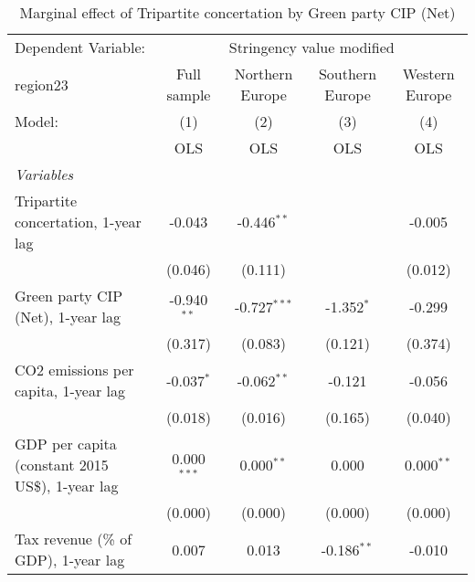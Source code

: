 
\begin{table}[htbp]
   \caption{Marginal effect of Tripartite concertation by Green party CIP (Net)}
   \centering
   \begin{tabular}{lcccc}
      \toprule
      Dependent Variable: & \multicolumn{4}{c}{Stringency value modified}\\
      region23                                                                & Full sample   & Northern Europe & Southern Europe & Western Europe \\   
      Model:                                                                  & (1)           & (2)             & (3)             & (4)\\  
                                                                              &  OLS          & OLS             & OLS             & OLS\\  
      \midrule
      \emph{Variables}\\
      Tripartite concertation, 1-year lag                                     & -0.043        & -0.446$^{**}$   &                 & -0.005\\   
                                                                              & (0.046)       & (0.111)         &                 & (0.012)\\   
      Green party CIP (Net), 1-year lag                                       & -0.940$^{**}$ & -0.727$^{***}$  & -1.352$^{*}$    & -0.299\\   
                                                                              & (0.317)       & (0.083)         & (0.121)         & (0.374)\\   
      CO2 emissions per capita, 1-year lag                                    & -0.037$^{*}$  & -0.062$^{**}$   & -0.121          & -0.056\\   
                                                                              & (0.018)       & (0.016)         & (0.165)         & (0.040)\\   
      GDP per capita (constant 2015 US\$), 1-year lag                         & 0.000$^{***}$ & 0.000$^{**}$    & 0.000           & 0.000$^{**}$\\   
                                                                              & (0.000)       & (0.000)         & (0.000)         & (0.000)\\   
      Tax revenue (\% of GDP), 1-year lag                                     & 0.007         & 0.013           & -0.186$^{**}$   & -0.010\\   

\end{tabular}
\end{table}
